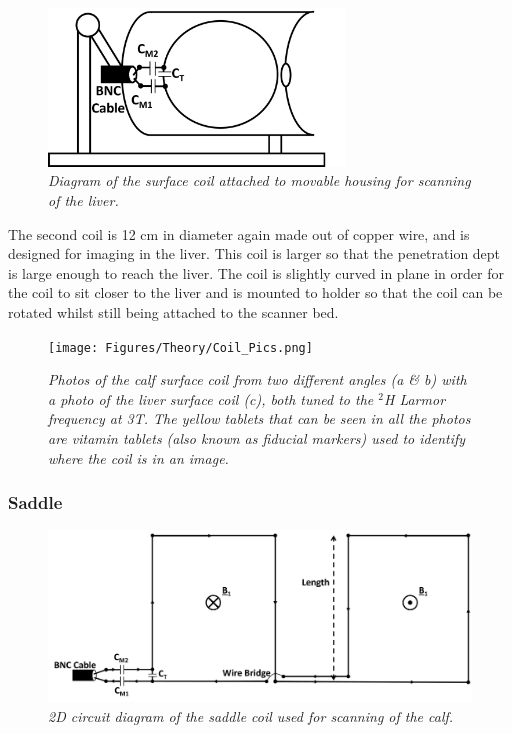 \begin{figure}
    \centering
    \includegraphics[width=0.7\textwidth]{Figures/Theory/Liver_Coil.png}
    \caption{\textit{Diagram of the surface coil attached to movable housing for scanning of the liver.}}
    \label{fig:theory:Liver}
\end{figure}

The second coil is 12 cm in diameter again made out of copper wire, and is designed for imaging in the liver. This coil is larger so that the penetration dept is large enough to reach the liver. The coil is slightly curved in plane in order for the coil to sit closer to the liver and is mounted to holder so that the coil can be rotated whilst still being attached to the scanner bed.

\begin{figure}
    \centering
    \texttt{[image: Figures/Theory/Coil\_Pics.png]}
    \caption{\textit{Photos of the calf surface coil from two different angles (a \& b) with a photo of the liver surface coil (c), both tuned to the $^2$H Larmor frequency at 3T. The yellow tablets that can be seen in all the photos are vitamin tablets (also known as fiducial markers) used to identify where the coil is in an image.}}
    \label{fig:theory:Pics}
\end{figure}

\subsubsection{Saddle}

\begin{figure}
    \centering
    \includegraphics[width=1\textwidth]{Figures/Theory/Planar_Saddle.png}
    \caption{\textit{2D circuit diagram of the saddle coil used for scanning of the calf.}}
    \label{fig:theory:2D_Saddle}
\end{figure}

